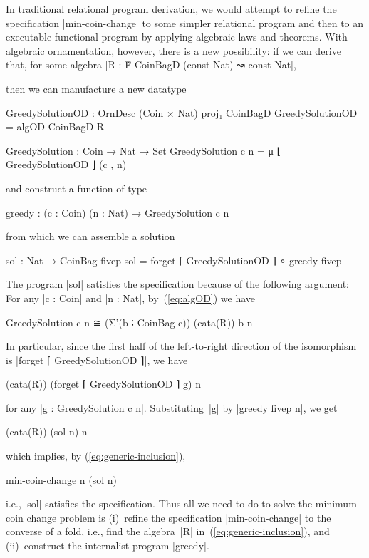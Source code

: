 In traditional relational program derivation, we would attempt to refine the specification |min-coin-change| to some simpler relational program and then to an executable functional program by applying algebraic laws and theorems.
With algebraic ornamentation, however, there is a new possibility: if we can derive that, for some algebra |R : Ḟ CoinBagD (const Nat) ↝ const Nat|,
then we can manufacture a new datatype
\begin{code}
GreedySolutionOD : OrnDesc (Coin × Nat) proj₁ CoinBagD
GreedySolutionOD = algOD CoinBagD R

GreedySolution : Coin → Nat → Set
GreedySolution c n = μ ⌊ GreedySolutionOD ⌋ (c , n)
\end{code}
and construct a function of type
\begin{code}
greedy : (c : Coin) (n : Nat) → GreedySolution c n
\end{code}
from which we can assemble a solution
\begin{code}
sol : Nat → CoinBag fivep
sol = forget ⌈ GreedySolutionOD ⌉ ∘ greedy fivep
\end{code}
The program |sol| satisfies the specification because of the following argument:
For any |c : Coin| and |n : Nat|, by~(\ref{eq:algOD}) we have
\begin{code}
GreedySolution c n ≅ (Σ'(b ∶ CoinBag c)) (cata(R)) b n
\end{code}
In particular, since the first half of the left-to-right direction of the isomorphism is |forget ⌈ GreedySolutionOD ⌉|, we have
\begin{code}
(cata(R)) (forget ⌈ GreedySolutionOD ⌉ g) n
\end{code}
for any |g : GreedySolution c n|.
Substituting~|g| by |greedy fivep n|, we get
\begin{code}
(cata(R)) (sol n) n
\end{code}
which implies, by (\ref{eq:generic-inclusion}),
\begin{code}
min-coin-change n (sol n)
\end{code}
i.e., |sol| satisfies the specification.
Thus all we need to do to solve the minimum coin change problem is (i)~refine the specification |min-coin-change| to the converse of a fold, i.e., find the algebra~|R| in~(\ref{eq:generic-inclusion}), and (ii)~construct the internalist program |greedy|.

